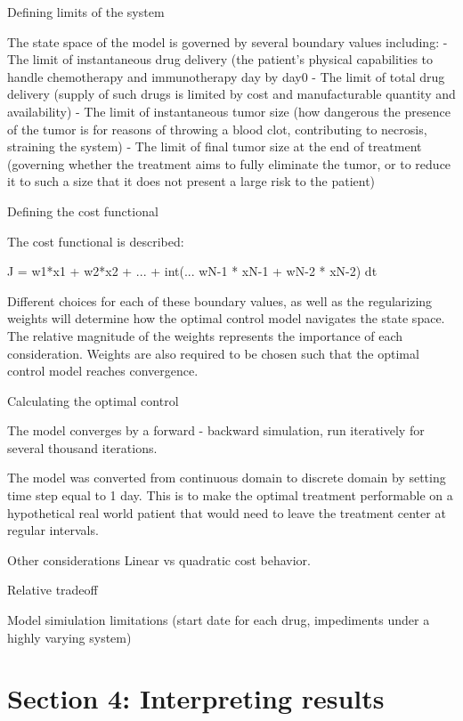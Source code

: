 \documentclass{article}
\begin{document}
Defining limits of the system

The state space of the model is governed by several boundary values including:
- The limit of instantaneous drug delivery (the patient's physical capabilities to handle chemotherapy and immunotherapy day by day0
- The limit of total drug delivery (supply of such drugs is limited by cost and manufacturable quantity and availability)
- The limit of instantaneous tumor size (how dangerous the presence of the tumor is for reasons of throwing a blood clot, contributing to necrosis, straining the system) 
- The limit of final tumor size at the end of treatment (governing whether the treatment aims to fully eliminate the tumor, or to reduce it to such a size that it does not present a large risk to the patient)



Defining the cost functional

The cost functional is described: 

J = w1*x1 + w2*x2 + ... + int(... wN-1 * xN-1 + wN-2 * xN-2) dt


Different choices for each of these boundary values, as well as the regularizing weights will determine how the optimal control model navigates the state space. The relative magnitude of the weights represents the importance of each consideration. Weights are also required to be chosen such that the optimal control model reaches convergence. 


Calculating the optimal control

The model converges by a forward - backward simulation, run iteratively for several thousand iterations. 

The model was converted from continuous domain to discrete domain by setting time step equal to 1 day. This is to make the optimal treatment performable on a hypothetical real world patient that would need to leave the treatment center at regular intervals. 



Other considerations
Linear vs quadratic cost behavior. 

Relative tradeoff

Model simiulation limitations (start date for each drug, impediments under a highly varying system)

\section{Section 4: Interpreting results}
\end{document}
